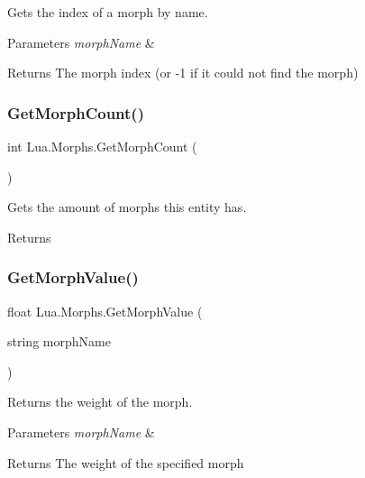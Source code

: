 Gets the index of a morph by name. 


\begin{DoxyParams}{Parameters}
{\em morph\+Name} & \\
\hline
\end{DoxyParams}
\begin{DoxyReturn}{Returns}
The morph index (or -\/1 if it could not find the morph)
\end{DoxyReturn}
\mbox{\label{class_lua_1_1_morphs_ad8c500e4a1dafbc13c39b762b860d49b}} 
\subsubsection{\texorpdfstring{GetMorphCount()}{GetMorphCount()}}
{\footnotesize\ttfamily int Lua.\+Morphs.\+Get\+Morph\+Count (\begin{DoxyParamCaption}{ }\end{DoxyParamCaption})}



Gets the amount of morphs this entity has. 

\begin{DoxyReturn}{Returns}

\end{DoxyReturn}
\mbox{\label{class_lua_1_1_morphs_aa2abe4bd241377c0589799e32bb6fe55}} 
\subsubsection{\texorpdfstring{GetMorphValue()}{GetMorphValue()}\hspace{0.1cm}{\footnotesize\ttfamily [1/2]}}
{\footnotesize\ttfamily float Lua.\+Morphs.\+Get\+Morph\+Value (\begin{DoxyParamCaption}\item[{string}]{morph\+Name }\end{DoxyParamCaption})}



Returns the weight of the morph. 


\begin{DoxyParams}{Parameters}
{\em morph\+Name} & \\
\hline
\end{DoxyParams}
\begin{DoxyReturn}{Returns}
The weight of the specified morph
\end{DoxyReturn}
\mbox{\label{class_lua_1_1_morphs_a18a50bb7510eb2c33f285a0cccbee9a4}} 
